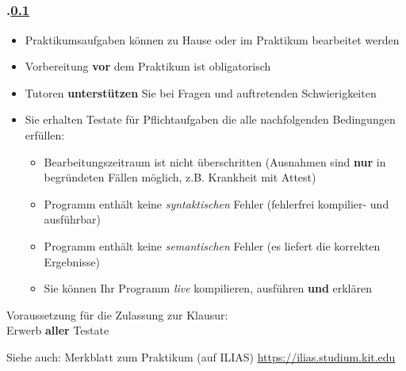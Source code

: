 \subsection{\stitle}\label{S:Praktikum}
\begin{frame}[fragile]%
  \frametitle{\kap.\ref{S:Praktikum} \stitle}%

\begin{itemize}
  \item Praktikumsaufgaben können zu Hause oder im Praktikum bearbeitet werden
  \item Vorbereitung \textbf{vor} dem Praktikum ist obligatorisch
  \item Tutoren \textbf{unterstützen} Sie bei Fragen und auftretenden Schwierigkeiten
  \item Sie erhalten Testate für Pflichtaufgaben die alle nachfolgenden Bedingungen erfüllen:
  \begin{itemize}
    \item Bearbeitungszeitraum ist nicht überschritten (Ausnahmen sind \textbf{nur} in begründeten Fällen möglich, z.B. Krankheit mit Attest)
    \item Programm enthält keine \emph{syntaktischen} Fehler (fehlerfrei kompilier- und ausführbar)
    \item Programm enthält keine \emph{semantischen} Fehler (es liefert die korrekten Ergebnisse)
    \item Sie können Ihr Programm \emph{live} kompilieren, ausführen \textbf{und} erklären
  \end{itemize}
\end{itemize}
\hfill

\begin{center}
 \textcolor{KITred}{Voraussetzung für die Zulassung zur Klausur:\\ Erwerb \textbf{aller} Testate}
\end{center}
\hfill

Siehe auch: Merkblatt zum Praktikum (auf ILIAS) \url{https://ilias.studium.kit.edu}
\end{frame}


\def\stitle{Einordnung und Zusammenfassung}%
